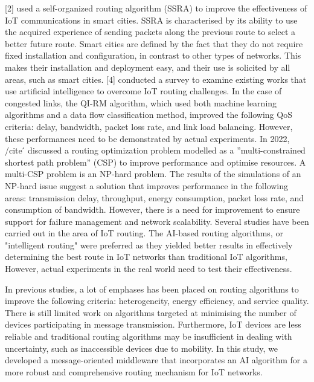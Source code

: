  [2] used a self-organized routing algorithm (SSRA) to improve the effectiveness of IoT communications in smart cities. SSRA is characterised by its 
ability to use the acquired experience of sending packets along the previous route to select a better future route. 
Smart cities are defined by the fact that they do not require fixed installation and configuration, in contrast to other 
types of networks. This makes their installation and deployment easy, and their use is solicited by all areas, such as 
smart cities. [4] conducted a survey to examine existing works that use artificial intelligence to overcome IoT routing 
challenges. In the case of congested links, the QI-RM algorithm, which used both machine learning algorithms and a data 
flow classification method, improved the following QoS criteria: delay, bandwidth, packet loss rate, and link load 
balancing. However, these performances need to be demonstrated by actual experiments. In 2022, /cite ́ discussed a routing 
optimization problem modelled as a ”multi-constrained shortest path problem” (CSP) to improve performance and optimise
 resources. A multi-CSP problem is an NP-hard problem. The results of the simulations of an NP-hard issue suggest a solution 
that improves performance in the following areas: transmission delay, throughput, energy consumption, packet loss rate,
and consumption of bandwidth. However, there is a need for improvement to ensure support for failure management and network 
scalability. 
Several studies have been carried out in the area of IoT routing. The AI-based routing algorithms, or "intelligent routing"
were preferred as they yielded better results in effectively determining the best route in IoT networks than traditional
IoT algorithms, However, actual experiments in the real world need to test their effectiveness. 

In previous studies, a lot of emphases has been placed on routing algorithms to improve the following criteria: heterogeneity,
energy efficiency, and service quality. There is still limited work on algorithms targeted at minimising the number of devices 
participating in message transmission. Furthermore, IoT devices are less reliable and traditional routing algorithms may be 
insufficient in dealing with uncertainty, such as inaccessible devices due to mobility. 
In this study, we developed a message-oriented middleware that incorporates an AI algorithm for a more robust and comprehensive 
routing mechanism for IoT networks.

